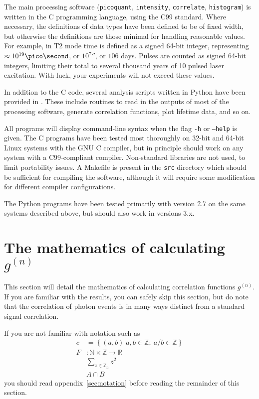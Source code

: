 \documentclass{article}
\newcommand{\braces}[1]{\ensuremath{\left\lbrace #1 \right\rbrace}}
\newcommand{\picoquant}{\texttt{picoquant}}
\newcommand{\intensity}{\texttt{intensity}}
\newcommand{\correlate}{\texttt{correlate}}
\newcommand{\histogram}{\texttt{histogram}}
\newcommand{\gn}[1]{\ensuremath{g^{(#1)}}}
\newcommand{\integers}{\ensuremath{\mathbb{Z}}}
\newcommand{\wholes}{\ensuremath{\mathbb{N}}}
\newcommand{\reals}{\ensuremath{\mathbb{R}}}
\begin{document}
The main processing software (\picoquant, \intensity, \correlate, \histogram) is written in the C programming language, using the C99 standard. Where necessary, the definitions of data types have been defined to be of fixed width, but otherwise the definitions are those minimal for handling reasonable values. For example, in T2 mode time is defined as a signed 64-bit integer, representing $\approx 10^{19}\pico\second$, or $10^{7}\second$, or $106$ days. Pulses are counted as signed 64-bit integers, limiting their total to several thousand years of 10\mega\hertz{} pulsed laser excitation. With luck, your experiments will not exceed these values. 

In addition to the C code, several analysis scripts written in Python have been provided in . These include routines to read in the outputs of most of the processing software, generate correlation functions, plot lifetime data, and so on. 

All programs will display command-line syntax when the flag \texttt{-h} or \texttt{--help} is given. The C programs have been tested most thoroughly on 32-bit and 64-bit Linux systems with the GNU C compiler, but in principle should work on any system with a C99-compliant compiler. Non-standard libraries are not used, to limit portability issues. A Makefile is present in the \texttt{src} directory which should be sufficient for compiling the software, although it will require some modification for different compiler configurations.

The Python programs have been tested primarily with version 2.7 on the same systems described above, but should also work in versions 3.x.

\section{The mathematics of calculating \gn{n}}
\label{sec:math_background}
This section will detail the mathematics of calculating correlation functions \gn{n}. If you are familiar with the results, you can safely skip this section, but do note that the correlation of photon events is in many ways distinct from a standard signal correlation.

If you are not familiar with notation such as
\begin{align}
c &= \braces{(a,b)|a,b\in\integers;~a/b\in\integers} \\
F&:\wholes\times\integers\rightarrow\reals \\
&\sum_{z\in\integers_{n}}{z^{2}} \\
&A\cap B
\end{align}
you should read appendix~\ref{sec:notation} before reading the remainder of this section.
\end{document}
